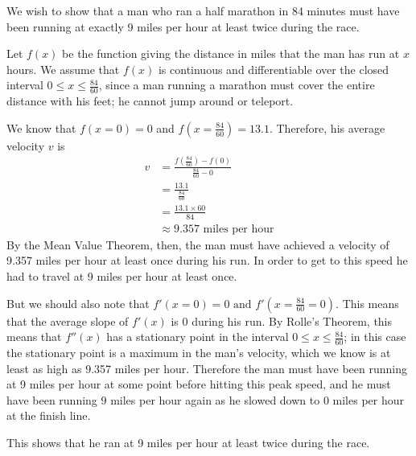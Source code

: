 \documentclass{article}
\begin{document}
We wish to show that a man who ran a half marathon in 84 minutes must have been running at exactly 9 miles per hour at least twice during the race.

Let $f(x)$ be the function giving the distance in miles that the man has run at $x$ hours. We assume that $f(x)$ is continuous and differentiable over the closed interval $0 \leqslant x \leqslant \frac{84}{60}$, since a man running a marathon must cover the entire distance with his feet; he cannot jump around or teleport.

We know that $f(x = 0) = 0$ and $f(x = \frac{84}{60}) = 13.1$. Therefore, his average velocity $v$ is
\begin{equation*}
\begin{aligned}
v &= \frac{f(\frac{84}{60}) - f(0)}{\frac{84}{60}-0}\\
&= \frac{13.1}{\frac{84}{60}}\\
&= \frac{13.1 \times 60}{84}\\
&\approx 9.357 \text{ miles per hour}
\end{aligned}
\end{equation*}
By the Mean Value Theorem, then, the man must have achieved a velocity of 9.357 miles per hour at least once during his run. In order to get to this speed he had to travel at 9 miles per hour at least once.

But we should also note that $f'(x = 0) = 0 \text{ and } f'(x = \frac{84}{60} = 0)$. This means that the average slope of $f'(x)$ is 0 during his run. By Rolle's Theorem, this means that $f''(x)$ has a stationary point in the interval $0 \leqslant x \leqslant \frac{84}{60}$; in this case the stationary point is a maximum in the man's velocity, which we know is at least as high as 9.357 miles per hour. Therefore the man must have been running at 9 miles per hour at some point before hitting this peak speed, and he must have been running 9 miles per hour again as he slowed down to 0 miles per hour at the finish line. 

This shows that he ran at 9 miles per hour at least twice during the race.
\end{document}
